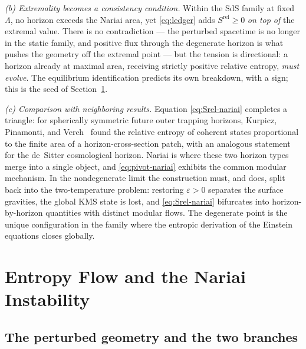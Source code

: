 \documentclass[11pt]{article}
\newcommand{\Srel}{S^{\mathrm{rel}}}
\newcommand{\Nariai}{Nariai}
\begin{document}
\emph{(b) Extremality becomes a consistency condition.} Within the SdS family at fixed $\Lambda$, no horizon exceeds the \Nariai{} area, yet \eqref{eq:ledger} adds $\Srel \ge 0$ \emph{on top of} the extremal value. There is no contradiction --- the perturbed spacetime is no longer in the static family, and positive flux through the degenerate horizon is what pushes the geometry off the extremal point --- but the tension is directional: a horizon already at maximal area, receiving strictly positive relative entropy, \emph{must evolve}. The equilibrium identification predicts its own breakdown, with a sign; this is the seed of Section~\ref{sec:instability}.

\emph{(c) Comparison with neighboring results.} Equation \eqref{eq:Srel-nariai} completes a triangle: for spherically symmetric future outer trapping horizons, Kurpicz, Pinamonti, and Verch~\cite{KPV} found the relative entropy of coherent states proportional to the finite area of a horizon-cross-section patch, with an analogous statement for the de~Sitter cosmological horizon. \Nariai{} is where these two horizon types merge into a single object, and \eqref{eq:pivot-nariai} exhibits the common modular mechanism. In the nondegenerate limit the construction must, and does, split back into the two-temperature problem: restoring $\varepsilon > 0$ separates the surface gravities, the global KMS state is lost, and \eqref{eq:Srel-nariai} bifurcates into horizon-by-horizon quantities with distinct modular flows. The degenerate point is the unique configuration in the family where the entropic derivation of the Einstein equations closes globally.

\section{Entropy Flow and the \Nariai{} Instability}
\label{sec:instability}

\subsection{The perturbed geometry and the two branches}
\end{document}
